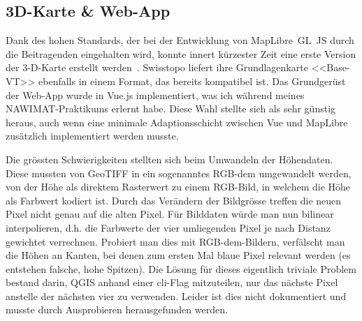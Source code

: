 \subsection{3D-Karte \& Web-App}

Dank des hohen Standards, der bei der Entwicklung von MapLibre~GL~JS durch die Beitragenden eingehalten wird, konnte innert kürzester Zeit eine erste Version der 3-D-Karte erstellt werden~\cite{maplibregljs}. Swisstopo liefert ihre Grundlagenkarte <<Base-VT>> ebenfalls in einem Format, das bereits kompatibel ist. Das Grundgerüst der Web-App wurde in Vue.js implementiert, was ich während meines NAWIMAT-Praktikums erlernt habe. Diese Wahl stellte sich als sehr günstig heraus, auch wenn eine minimale Adaptionsschicht zwischen Vue und MapLibre zusätzlich implementiert werden musste.

Die grössten Schwierigkeiten stellten sich beim Umwandeln der Höhendaten. Diese mussten von GeoTIFF in ein sogenanntes RGB-\acrshort{dem} umgewandelt werden, von der Höhe als direktem Rasterwert zu einem RGB-Bild, in welchem die Höhe als Farbwert kodiert ist. Durch das Verändern der Bildgrösse treffen die neuen Pixel nicht genau auf die alten Pixel. Für Bilddaten würde man nun bilinear interpolieren, d.h. die Farbwerte der vier umliegenden Pixel je nach Distanz gewichtet verrechnen. Probiert man dies mit RGB-\acrshort{dem}-Bildern, verfälscht man die Höhen an Kanten, bei denen zum ersten Mal blaue Pixel relevant werden (es entstehen falsche, hohe Spitzen). Die Lösung für dieses eigentlich triviale Problem bestand darin, QGIS anhand einer \acrshort{cli}-Flag mitzuteilen, nur das nächste Pixel anstelle der nächsten vier zu verwenden. Leider ist dies nicht dokumentiert und musste durch Ausprobieren herausgefunden werden.

